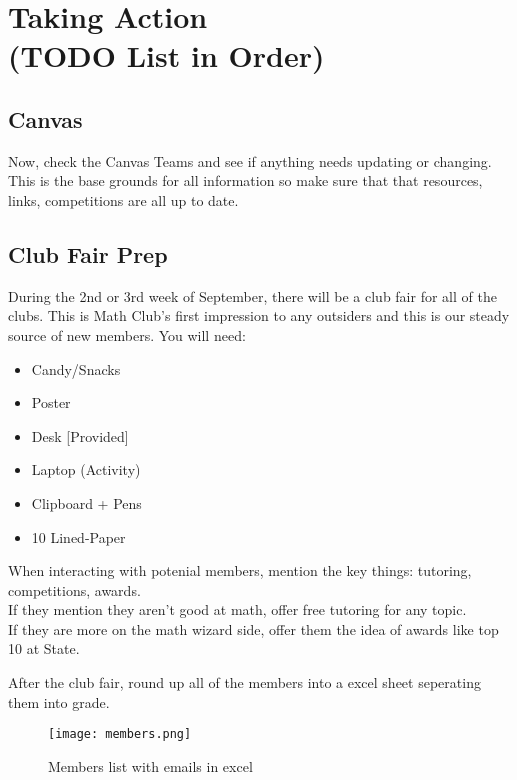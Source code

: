 \chapter{Taking Action \\ (TODO List in Order)}


\section{Canvas}
Now, check the Canvas Teams and see if anything needs updating or changing.
This is the base grounds for all information so make sure that 
that resources, links, competitions are all up to date.

\section{Club Fair Prep}
During the 2nd or 3rd week of September, there will be a club fair for all of the clubs.
This is Math Club's first impression to any outsiders and this is our steady source of new members.
\newline
\newline
You will need:

\begin{itemize}
    \item Candy/Snacks
    \item Poster
    \item Desk [Provided]
    \item Laptop (Activity)
    \item Clipboard + Pens
    \item 10 Lined-Paper
\end{itemize}

\newpage
When interacting with potenial members, mention the key things: tutoring, competitions, awards. \\
If they mention they aren't good at math, offer free tutoring for any topic. \\
If they are more on the math wizard side, offer them the idea of awards like top 10 at State.
\newline
\newline

After the club fair, round up all of the members into a excel sheet seperating them into grade.
\begin{figure}[H]
    \centering
    \texttt{[image: members.png]}
    \caption{Members list with emails in excel}
    \label{fig:old competition image example}
\end{figure}

